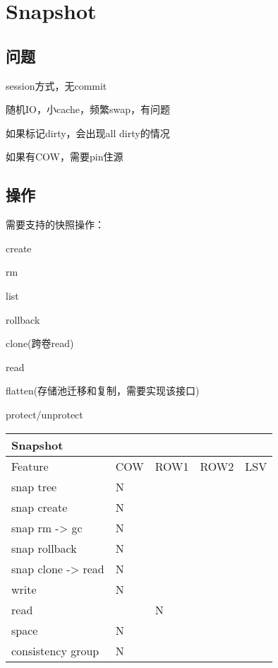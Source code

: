 \chapter{Snapshot}

\section{问题}

\begin{enumbox}
\item session方式，无commit
\item 随机IO，小cache，频繁swap，有问题
\item 如果标记dirty，会出现all dirty的情况
\item 如果有COW，需要pin住源
\end{enumbox}

\section{操作}

需要支持的快照操作：
\begin{enumbox}
\item create
\item rm
\item list
\item rollback
\item clone(跨卷read)
\item read
\item flatten(存储池迁移和复制，需要实现该接口)
\item protect/unprotect
\end{enumbox}

\begin{tabular}{|s|p{0.6cm}|p{0.6cm}|p{0.6cm}|p{0.6cm}| }
    \hline
      {Snapshot} \\
    \hline
    Feature & COW & ROW1 & ROW2 & LSV \\
    \hline
    snap tree & N &  & & \\
    \hline
    snap create & N &  & & \\
    \hline
    snap rm -> gc & N &  & & \\
    \hline
    snap rollback & N &  & & \\
    \hline
    snap clone -> read & N & & & \\
    \hline
    write & N &  & & \\
    \hline
    read & & N & & \\
    \hline
    space & N &  & & \\
    \hline
    consistency group & N &  & & \\
    \hline
\end{tabular}


